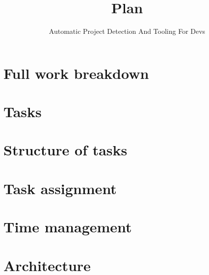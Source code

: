 \documentclass{article}
\title{Plan}
\author{Automatic Project Detection And Tooling For Devs}
\date{}
\begin{document}
\maketitle

\section{Full work breakdown}

\section{Tasks}

\section{Structure of tasks}

\section{Task assignment}

\section{Time management}

\section{Architecture}
\end{document}
